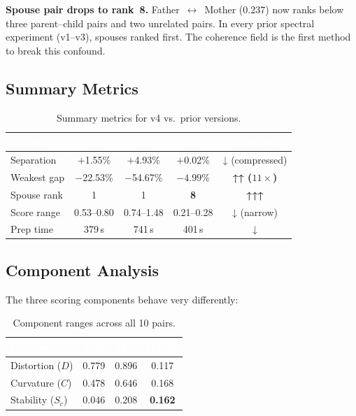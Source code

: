 \documentclass{../yalumba}
\begin{document}
\begin{keyfinding}
\textbf{Spouse pair drops to rank~8.}  Father~$\leftrightarrow$~Mother
(0.237) now ranks below three parent--child pairs and two unrelated pairs.
In every prior spectral experiment (v1--v3), spouses ranked first.  The
coherence field is the first method to break this confound.
\end{keyfinding}

\subsection{Summary Metrics}

\begin{table}[H]
  \centering
  \tablestyle
  \caption{Summary metrics for v4 vs.\ prior versions.}
  \label{tab:summary}
  \begin{tabular}{lcccc}
    \toprule
    \rowcolor{table-header}
    \textcolor{white}{\textbf{Metric}} &
    \textcolor{white}{\textbf{v2}} &
    \textcolor{white}{\textbf{v3}} &
    \textcolor{white}{\textbf{v4}} &
    \textcolor{white}{\textbf{Direction}} \\
    \midrule
    Separation & $+$1.55\% & $+$4.93\% & $+$0.02\% & ↓ (compressed) \\
    Weakest gap & $-$22.53\% & $-$54.67\% & $\mathbf{-4.99\%}$ & \textbf{↑↑ ($11\times$)} \\
    Spouse rank & 1 & 1 & \textbf{8} & \textbf{↑↑↑} \\
    Score range & 0.53--0.80 & 0.74--1.48 & 0.21--0.28 & ↓ (narrow) \\
    Prep time & 379\,s & 741\,s & 401\,s & ↓ \\
    \bottomrule
  \end{tabular}
\end{table}

\subsection{Component Analysis}

The three scoring components behave very differently:

\begin{table}[H]
  \centering
  \tablestyle
  \caption{Component ranges across all 10 pairs.}
  \label{tab:components}
  \begin{tabular}{lccc}
    \toprule
    \rowcolor{table-header}
    \textcolor{white}{\textbf{Component}} &
    \textcolor{white}{\textbf{Min}} &
    \textcolor{white}{\textbf{Max}} &
    \textcolor{white}{\textbf{Range}} \\
    \midrule
    Distortion ($D$) & 0.779 & 0.896 & 0.117 \\
    Curvature ($C$) & 0.478 & 0.646 & 0.168 \\
    Stability ($S_c$) & 0.046 & 0.208 & \textbf{0.162} \\
    \bottomrule
  \end{tabular}
\end{table}
\end{document}
